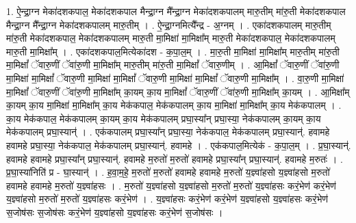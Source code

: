 \documentclass[17pt]{extarticle}
\begin{document}
1. ऐ॒न्द्रा॒ग्न मेका॑दशकपाल॒ मेका॑दशकपाल मैन्द्रा॒ग्न मै᳚न्द्रा॒ग्न मेका॑दशकपालम् मारु॒तीम् मा॑रु॒ती मेका॑दशकपाल मैन्द्रा॒ग्न मै᳚न्द्रा॒ग्न मेका॑दशकपालम् मारु॒तीम् । . ऐ॒न्द्रा॒ग्नमित्यै᳚न्द्र - अ॒ग्नम् । . एका॑दशकपालम् मारु॒तीम् मा॑रु॒ती मेका॑दशकपाल॒ मेका॑दशकपालम् मारु॒ती मा॒मिक्षा॑ मा॒मिक्षा᳚म् मारु॒ती मेका॑दशकपाल॒ मेका॑दशकपालम् मारु॒ती मा॒मिक्षा᳚म् । . एका॑दशकपाल॒मित्येका॑दश - क॒पा॒ल॒म् । . मा॒रु॒ती मा॒मिक्षा॑ मा॒मिक्षा᳚म् मारु॒तीम् मा॑रु॒ती मा॒मिक्षां᳚ ॅवारु॒णीं ॅवा॑रु॒णी मा॒मिक्षा᳚म् मारु॒तीम् मा॑रु॒ती मा॒मिक्षां᳚ ॅवारु॒णीम् । . आ॒मिक्षां᳚ ॅवारु॒णीं ॅवा॑रु॒णी मा॒मिक्षा॑ मा॒मिक्षां᳚ ॅवारु॒णी मा॒मिक्षा॑ मा॒मिक्षां᳚ ॅवारु॒णी मा॒मिक्षा॑ मा॒मिक्षां᳚ ॅवारु॒णी मा॒मिक्षा᳚म् । . वा॒रु॒णी मा॒मिक्षा॑ मा॒मिक्षां᳚ ॅवारु॒णीं ॅवा॑रु॒णी मा॒मिक्षा᳚म् का॒यम् का॒य मा॒मिक्षां᳚ ॅवारु॒णीं ॅवा॑रु॒णी मा॒मिक्षा᳚म् का॒यम् । . आ॒मिक्षा᳚म् का॒यम् का॒य मा॒मिक्षा॑ मा॒मिक्षा᳚म् का॒य मेक॑कपाल॒ मेक॑कपालम् का॒य मा॒मिक्षा॑ मा॒मिक्षा᳚म् का॒य मेक॑कपालम् । . का॒य मेक॑कपाल॒ मेक॑कपालम् का॒यम् का॒य मेक॑कपालम् प्रघा॒स्या᳚न् प्रघा॒स्या॒ नेक॑कपालम् का॒यम् का॒य मेक॑कपालम् प्रघा॒स्यान्॑ । . एक॑कपालम् प्रघा॒स्या᳚न् प्रघा॒स्या॒ नेक॑कपाल॒ मेक॑कपालम् प्रघा॒स्यान्॑. हवामहे हवामहे प्रघा॒स्या॒ नेक॑कपाल॒ मेक॑कपालम् प्रघा॒स्यान्॑. हवामहे । . एक॑कपाल॒मित्येक॑ - क॒पा॒ल॒म् । . प्र॒घा॒स्यान्॑. हवामहे हवामहे प्रघा॒स्या᳚न् प्रघा॒स्यान्॑. हवामहे म॒रुतो॑ म॒रुतो॑ हवामहे प्रघा॒स्या᳚न् प्रघा॒स्यान्॑. हवामहे म॒रुतः॑ । . प्र॒घा॒स्या॑निति॑ प्र - घा॒स्यान्॑ । . ह॒वा॒म॒हे॒ म॒रुतो॑ म॒रुतो॑ हवामहे हवामहे म॒रुतो॑ य॒ज्ञ्वा॑हसो य॒ज्ञ्वा॑हसो म॒रुतो॑ हवामहे हवामहे म॒रुतो॑ य॒ज्ञ्वा॑हसः । . म॒रुतो॑ य॒ज्ञ्वा॑हसो य॒ज्ञ्वा॑हसो म॒रुतो॑ म॒रुतो॑ य॒ज्ञ्वा॑हसः करं॒भेण॑ करं॒भेण॑ य॒ज्ञ्वा॑हसो म॒रुतो॑ म॒रुतो॑ य॒ज्ञ्वा॑हसः करं॒भेण॑ । . य॒ज्ञ्वा॑हसः करं॒भेण॑ करं॒भेण॑ य॒ज्ञ्वा॑हसो य॒ज्ञ्वा॑हसः करं॒भेण॑ स॒जोष॑सः स॒जोष॑सः करं॒भेण॑ य॒ज्ञ्वा॑हसो य॒ज्ञ्वा॑हसः करं॒भेण॑ स॒जोष॑सः । \newline
\end{document}
